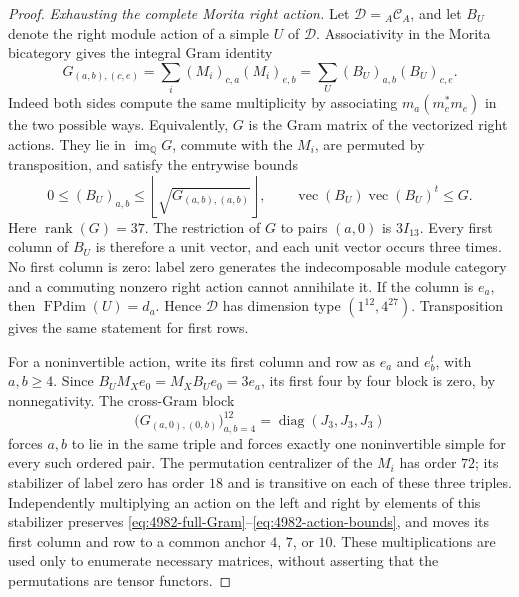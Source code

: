 \begin{proof}
\emph{Exhausting the complete Morita right action.}
Let $\mathcal D={}_A\mathcal C_A$, and let $B_U$ denote the right
module action of a simple $U$ of $\mathcal D$.
Associativity in the Morita bicategory gives the integral Gram
identity
\begin{equation}
 G_{(a,b),(c,e)}=\sum_i(M_i)_{c,a}(M_i)_{e,b}
   =\sum_U(B_U)_{a,b}(B_U)_{c,e}.
 \label{eq:4982-full-Gram}
\end{equation}
Indeed both sides compute the same multiplicity by associating
$m_a(m_c^*m_e)$ in the two possible ways. Equivalently, $G$ is the
Gram matrix of the vectorized right actions. They lie in
$\operatorname{im}_{\mathbb Q}G$, commute with the $M_i$, are
permuted by transposition, and satisfy the entrywise bounds
\begin{equation}
 0\leq (B_U)_{a,b}\leq
 \left\lfloor\sqrt{G_{(a,b),(a,b)}}\right\rfloor,
 \qquad \operatorname{vec}(B_U)\operatorname{vec}(B_U)^t\leq G.
 \label{eq:4982-action-bounds}
\end{equation}
Here $\operatorname{rank}(G)=37$.
The restriction of $G$ to pairs $(a,0)$ is $3I_{13}$.
Every first column of $B_U$ is therefore a unit vector, and each
unit vector occurs three times. No first column is zero: label
zero generates the indecomposable module category and a commuting
nonzero right action cannot annihilate it. If the column is $e_a$,
then $\operatorname{FPdim}(U)=d_a$. Hence $\mathcal D$ has dimension
type $(1^{12},4^{27})$. Transposition gives the same statement for
first rows.

For a noninvertible action, write its first column and row as
$e_a$ and $e_b^t$, with $a,b\geq4$. Since
$B_U M_X e_0=M_X B_U e_0=3e_a$, its first four by four block is
zero, by nonnegativity. The cross-Gram block
\begin{equation}
 \bigl(G_{(a,0),(0,b)}\bigr)_{a,b=4}^{12}
      =\operatorname{diag}(J_3,J_3,J_3)
 \label{eq:4982-cross-Gram}
\end{equation}
forces $a,b$ to lie in the same triple and forces exactly one
noninvertible simple for every such ordered pair.
The permutation centralizer of the $M_i$ has order $72$; its
stabilizer of label zero has order $18$ and is transitive on each
of these three triples. Independently multiplying an action on the
left and right by elements of this stabilizer preserves \eqref{eq:4982-full-Gram}--\eqref{eq:4982-action-bounds},
and moves its first column and row to a common anchor $4$, $7$, or
$10$. These multiplications are used only to enumerate necessary
matrices, without asserting that the permutations are tensor functors.


\end{proof}
